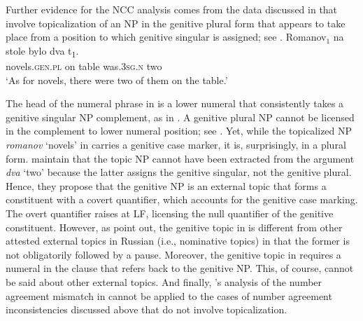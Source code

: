 \documentclass[output=paper,
modfonts,
newtxmath,
hidelinks
]{langscibook}
\begin{document}
\section{\citet{Franks-House1982}}\label{18:s4}
Further evidence for the NCC analysis comes from the data discussed in \citet{Franks-House1982} that involve topicalization of an NP in the genitive plural form that appears to take place from a position to which genitive singular is assigned; see .
\ea \label{18:ex27}
\gll Romanov$_1$  na  stole  bylo  dva         t\textsubscript{1}.\\
     novels.\textsc{gen.pl}  on  table  was.\textsc{3sg.n}  two\\\hfill\citep[157]{Franks-House1982}
\glt `As for novels, there were two of them on the table.'\\
\z
\ea \label{18:ex28}
	\z
\z 

\noindent The head of the numeral phrase in  is a lower numeral that consistently takes a genitive singular NP complement, as in . A genitive plural NP cannot be licensed in the complement to lower numeral position; see . Yet, while the topicalized NP \textit{romanov} ‘novels’ in  carries a genitive case marker, it is, surprisingly, in a plural form. \citeauthor{Franks-House1982} maintain that the topic NP cannot have been extracted from the argument \textit{dva} ‘two’ because the latter assigns the genitive singular, not the genitive plural. Hence, they propose that the genitive NP is an external topic that forms a constituent with a covert quantifier, which accounts for the genitive case marking. The overt quantifier raises at LF, licensing the null quantifier of the genitive constituent. However, as \citeauthor{Franks-House1982} point out, the genitive topic in  is different from other attested external topics in Russian (i.e., nominative topics) in that the former is not obligatorily followed by a pause. Moreover, the genitive topic in  requires a numeral in the clause that refers back to the genitive NP. This, of course, cannot be said about other external topics. And finally, \citeauthor{Franks-House1982}’s analysis of the number agreement mismatch in  cannot be applied to the cases of number agreement inconsistencies discussed above that do not involve topicalization. 
\end{document}
